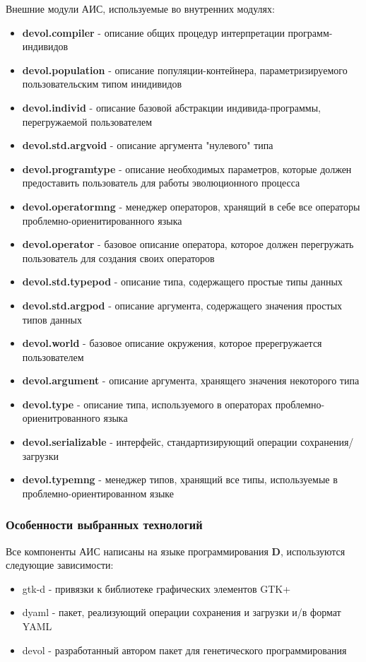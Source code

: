 \documentclass[russian,utf8,emptystyle]{eskdtext}
\begin{document}
Внешние модули АИС, используемые во внутренних модулях:
\begin{itemize}
\item \textbf{devol.compiler} - описание общих процедур интерпретации программ-индивидов
\item \textbf{devol.population} - описание популяции-контейнера, параметризируемого пользовательским типом инидивидов
\item \textbf{devol.individ} - описание базовой абстракции индивида-программы, перегружаемой пользователем
\item \textbf{devol.std.argvoid} - описание аргумента "нулевого" типа
\item \textbf{devol.programtype} - описание необходимых параметров, которые должен предоставить пользователь для работы эволюционного процесса
\item \textbf{devol.operatormng} - менеджер операторов, хранящий в себе все операторы проблемно-ориенитированного языка
\item \textbf{devol.operator} - базовое описание оператора, которое должен перегружать пользователь для создания своих операторов
\item \textbf{devol.std.typepod} - описание типа, содержащего простые типы данных
\item \textbf{devol.std.argpod} - описание аргумента, содержащего значения простых типов данных
\item \textbf{devol.world} - базовое описание окружения, которое пререгружается пользователем
\item \textbf{devol.argument} - описание аргумента, хранящего значения некоторого типа
\item \textbf{devol.type} - описание типа, используемого в операторах проблемно-ориенитрованного языка
\item \textbf{devol.serializable} - интерфейс, стандартизирующий операции сохранения/загрузки
\item \textbf{devol.typemng} - менеджер типов, хранящий все типы, используемые в проблемно-ориентированном языке
\end{itemize}

\subsubsection{Особенности выбранных технологий}
Все компоненты АИС написаны на языке программирования \textbf{D}, используются следующие зависимости:
\begin{itemize}
\item gtk-d - привязки к библиотеке графических элементов GTK+
\item dyaml - пакет, реализующий операции сохранения и загрузки и/в формат YAML
\item devol - разработанный автором пакет для генетического программирования
\end{itemize}
\end{document}
